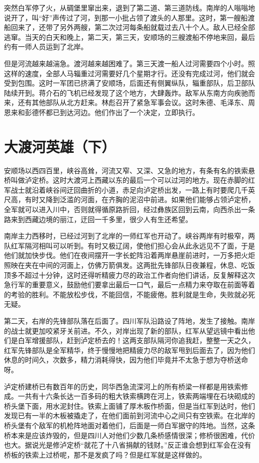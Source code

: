 \documentclass[10pt]{book}
\begin{document}
突然白军停了火，从碉堡里窜出来，退到了第二道、第三道防线。南岸的人嗡嗡地说开了，叫“好”声传过了河，到那一小批占领了渡头的人那里。这时，第一艘船渡船回来了，还带了另外两艘，第二次过河每条船就载过去八十个人。敌人已经全部逃窜。当天的白天和晚上，第二天，第三天，安顺场的三艘渡船不停地来回，最后约有一师人员运到了北岸。

但是河流越来越湍急。渡河越来越困难了。第三天渡一船人过河需要四个小时。照这样的速度，全部人马辎重过河需要好几个星期才行。还没有完成过河，他们就会受到包围。这时一军团已挤满了安顺场，后面还有侧翼纵队，辎重部队，后卫部队陆续开到。蒋介石的飞机已经发现了这个地方，大肆轰炸。敌军从东南方向疾驰而来，还有其他部队从北方赶来。林彪召开了紧急军事会议。这时朱德、毛泽东、周恩来和彭德怀都已到达河边。他们作出了一个决定，立即执行。




\section{大渡河英雄（下）}

安顺场以西四百里，峡谷高耸，河流又窄、又深、又急的地方，有条有名的铁索悬桥叫做泸定桥。这时大渡河上西藏以东的最后一个可以过河的地方。现在赤脚的红军战士就沿着峡谷间迂回曲折的小道，赤足向泸定桥出发，一路上有时要爬几千英尺高，有时又降到泛滥的河面，在齐胸的泥沼中前进。如果他们能够占领泸定桥，全军就可以进入川中，否则就得循原路折回，经过彝族区回到云南，向西杀出一条路来到西藏边境的丽江，迂回一千多里，很少人有生还希望。

南岸主力西移时，已经过河到了北岸的一师红军也开动了。峡谷两岸有时极窄，两队红军隔河相叫可以听到。有时又极辽阔，使他们担心会从此永远见不了面，于是他们就加快步伐。他们在夜间摆开一字长蛇阵沿着两岸悬崖前进时，一万多把火炬照映在夹在中间的河面上，仿佛万箭俱发。这两批先锋部队日夜兼程，休息、吃饭顶多不超过十分钟，这时还得听精疲力尽的政治工作者向他们讲话，反复解释这次急行军的重要意义，鼓励他们要拿出最后一口气，最后一点精力来夺取在前面等着的考验的胜利。不能放松步伐，不能回信，不能疲倦。胜利就是生命，失败就必死无疑。

第二天，右岸的先锋部队落在后面了。四川军队沿路设了阵地，发生了接触。南岸的战士就更加咬紧牙关前进。不久，对岸出现了新的部队，红军从望远镜中看出他们是白军增援部队，赶到泸定桥去的！这两支部队隔河你追我赶，整整一天之久，红军先锋部队是全军精华，终于慢慢地把精疲力尽的敌军甩到后面去了，因为他们休息的时间久，次数多，精力消耗得快，因为他们毕竟并不太急于想为夺桥送命呀。

泸定桥建桥已有数百年的历史，同华西急流深河上的所有桥梁一样都是用铁索修成。一共有十六条长达一百多码的粗大铁索横跨在河上，铁索两端埋在石块砌成的桥头堡下面，用水泥封住。铁索上面铺了厚木板作桥面，但是当红军到达时，他们发现已有一半的木板被撬走了，在他们面前到河流中心之间只有空铁索。在北岸的桥头堡有个敌军的机枪阵地面对着他们，后面是一师白军据守的阵地。当然，这条桥本来是应该炸毁的，但是四川人对他们少数几条桥感情很深；修桥很困难，代价也大。据说光是修泸定桥“就花了十八省捐献的钱财。”反正谁会想到红军会在没有桥板的铁索上过桥呢，那不是发疯了吗？但是红军就是这样做的。
\end{document}
